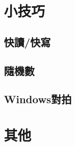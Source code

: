 \documentclass[a4paper,10pt,twocolumn,oneside]{article}
\begin{document}
\section{小技巧}
\subsection{快讀/快寫}

% 
\subsection{隨機數}

% 
\subsection{Windows對拍}



\section{其他}


\end{document}
